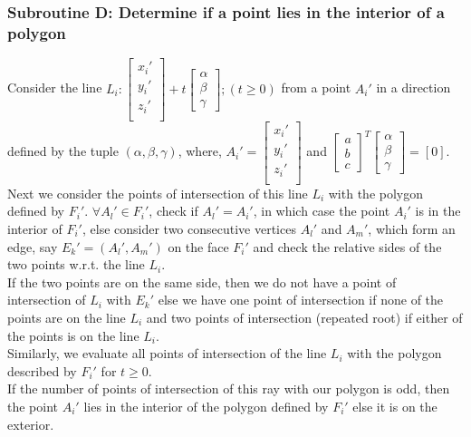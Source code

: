 \documentclass[12pt]{report}
\begin{document}
\subsubsection*{Subroutine D: Determine if a point lies in the interior of a polygon}
Consider the line \(L_{i}: \begin{bmatrix}  x_{i}' \\ y_{i}' \\ z_{i}' \\ \end{bmatrix} + t \begin{bmatrix} \alpha \\ \beta \\ \gamma \end{bmatrix}; (t \geqslant 0) \) from a point \(A_{i}'\) in a direction defined by the tuple \((\alpha,\beta,\gamma)\), where, \(A_{i}' = \begin{bmatrix}  x_{i}' \\ y_{i}' \\ z_{i}' \\ \end{bmatrix} \) and \(\begin{bmatrix} a \\ b \\ c \end{bmatrix}^{T} \begin{bmatrix} \alpha \\ \beta \\ \gamma \end{bmatrix} = [0] \). \\
Next we consider the points of intersection of this line \(L_{i}\) with the polygon defined by \( F_{i}'\). \( \forall A_{l}' \in F_{i}' \), check if \( A_{l}' = A_{i}'\), in which case the point \(A_{i}' \) is in the interior of \(F_{i}'\), else consider two consecutive vertices \(A_{l}'\) and \(A_{m}' \), which form an edge, say \(E_{k}' = (A_{l}',A_{m}') \) on the face \(F_{i}'\) and check the relative sides of the two points w.r.t. the line \(L_{i}\). \\
If the two points are on the same side, then we do not have a point of intersection of \(L_{i}\) with \(E_{k}'\) else we have one point of intersection if none of the points are on the line \(L_{i}\) and two points of intersection (repeated root) if either of the points is on the line \(L_{i}\). \\
Similarly, we evaluate all points of intersection of the line \(L_{i}\) with the polygon described by \(F_{i}'\) for \(t \geqslant 0 \).\\
If the number of points of intersection of this ray with our polygon is odd, then the point \(A_{i}'\) lies in the interior of the polygon defined by \( F_{i}'\) else it is on the exterior. \\
\end{document}
